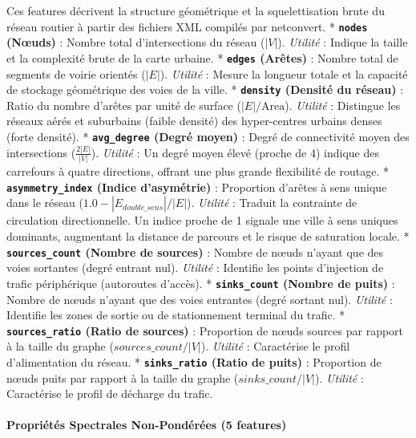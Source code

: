 \documentclass[11pt, a4paper]{article}
\begin{document}
Ces features décrivent la structure géométrique et la squelettisation
brute du réseau routier à partir des fichiers XML compilés par
netconvert. * \textbf{\texttt{nodes} (Nœuds)} : Nombre total
d'intersections du réseau (\(|V|\)). \emph{Utilité} : Indique la taille
et la complexité brute de la carte urbaine. * \textbf{\texttt{edges}
(Arêtes)} : Nombre total de segments de voirie orientés (\(|E|\)).
\emph{Utilité} : Mesure la longueur totale et la capacité de stockage
géométrique des voies de la ville. * \textbf{\texttt{density} (Densité
du réseau)} : Ratio du nombre d'arêtes par unité de surface
(\(|E|/\text{Area}\)). \emph{Utilité} : Distingue les réseaux aérés et
suburbains (faible densité) des hyper-centres urbains denses (forte
densité). * \textbf{\texttt{avg\_degree} (Degré moyen)} : Degré de
connectivité moyen des intersections (\(\frac{2|E|}{|V|}\)).
\emph{Utilité} : Un degré moyen élevé (proche de 4) indique des
carrefours à quatre directions, offrant une plus grande flexibilité de
routage. * \textbf{\texttt{asymmetry\_index} (Indice d'asymétrie)} :
Proportion d'arêtes à sens unique dans le réseau
(\(1.0 - |E_{double\_sens}|/|E|\)). \emph{Utilité} : Traduit la
contrainte de circulation directionnelle. Un indice proche de 1 signale
une ville à sens uniques dominants, augmentant la distance de parcours
et le risque de saturation locale. * \textbf{\texttt{sources\_count}
(Nombre de sources)} : Nombre de nœuds n'ayant que des voies sortantes
(degré entrant nul). \emph{Utilité} : Identifie les points d'injection
de trafic périphérique (autoroutes d'accès). *
\textbf{\texttt{sinks\_count} (Nombre de puits)} : Nombre de nœuds
n'ayant que des voies entrantes (degré sortant nul). \emph{Utilité} :
Identifie les zones de sortie ou de stationnement terminal du trafic. *
\textbf{\texttt{sources\_ratio} (Ratio de sources)} : Proportion de
nœuds sources par rapport à la taille du graphe
(\(sources\_count/|V|\)). \emph{Utilité} : Caractérise le profil
d'alimentation du réseau. * \textbf{\texttt{sinks\_ratio} (Ratio de
puits)} : Proportion de nœuds puits par rapport à la taille du graphe
(\(sinks\_count/|V|\)). \emph{Utilité} : Caractérise le profil de
décharge du trafic.

\paragraph{Propriétés Spectrales Non-Pondérées (5
features)}\label{propriuxe9tuxe9s-spectrales-non-ponduxe9ruxe9es-5-features}
\end{document}
